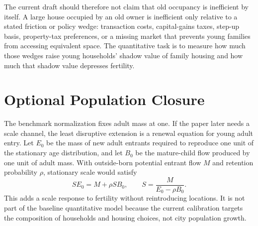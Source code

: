 \documentclass[11pt]{article}
\begin{document}
The current draft should therefore not claim that old occupancy is inefficient
by itself. A large house occupied by an old owner is inefficient only relative
to a stated friction or policy wedge: transaction costs, capital-gains taxes,
step-up basis, property-tax preferences, or a missing market that prevents young
families from accessing equivalent space. The quantitative task is to measure
how much those wedges raise young households' shadow value of family housing
and how much that shadow value depresses fertility.

\appendix
\section{Optional Population Closure}

The benchmark normalization fixes adult mass at one. If the paper later needs a
scale channel, the least disruptive extension is a renewal equation for young
adult entry. Let $E_0$ be the mass of new adult entrants required to reproduce
one unit of the stationary age distribution, and let $B_0$ be the mature-child
flow produced by one unit of adult mass. With outside-born potential entrant
flow $M$ and retention probability $\rho$, stationary scale would satisfy
\begin{equation}
    S E_0 = M+\rho S B_0,
    \qquad
    S=\frac{M}{E_0-\rho B_0}.
    \label{eq:renewal_scale}
\end{equation}
This adds a scale response to fertility without reintroducing locations. It is
not part of the baseline quantitative model because the current calibration
targets the composition of households and housing choices, not city population
growth.



\end{document}
